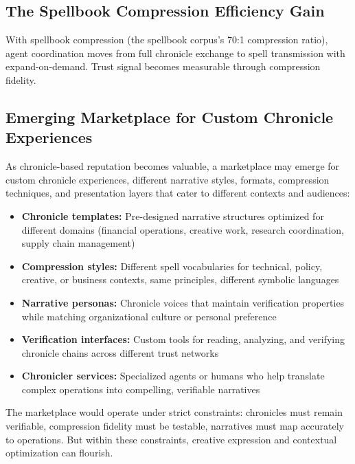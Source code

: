 \documentclass[
  11pt,
]{article}
\begin{document}
\subsection{The Spellbook Compression Efficiency
Gain}\label{the-spellbook-compression-efficiency-gain}

With spellbook compression (the spellbook corpus's 70:1 compression
ratio), agent coordination moves from full chronicle exchange to spell
transmission with expand-on-demand. Trust signal becomes measurable
through compression fidelity.

\subsection{Emerging Marketplace for Custom Chronicle
Experiences}\label{emerging-marketplace-for-custom-chronicle-experiences}

As chronicle-based reputation becomes valuable, a marketplace may emerge
for custom chronicle experiences, different narrative styles, formats,
compression techniques, and presentation layers that cater to different
contexts and audiences:

\begin{itemize}
\item
  \textbf{Chronicle templates:} Pre-designed narrative structures
  optimized for different domains (financial operations, creative work,
  research coordination, supply chain management)
\item
  \textbf{Compression styles:} Different spell vocabularies for
  technical, policy, creative, or business contexts, same principles,
  different symbolic languages
\item
  \textbf{Narrative personas:} Chronicle voices that maintain
  verification properties while matching organizational culture or
  personal preference
\item
  \textbf{Verification interfaces:} Custom tools for reading, analyzing,
  and verifying chronicle chains across different trust networks
\item
  \textbf{Chronicler services:} Specialized agents or humans who help
  translate complex operations into compelling, verifiable narratives
\end{itemize}

The marketplace would operate under strict constraints: chronicles must
remain verifiable, compression fidelity must be testable, narratives
must map accurately to operations. But within these constraints,
creative expression and contextual optimization can flourish.
\end{document}
